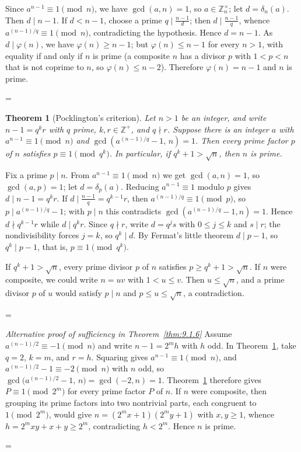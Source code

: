 \documentclass[11pt]{article}
\makeatletter
\theoremstyle{ntstyle}
\newtheorem{theorem}{Theorem}[subsection]
\let\nt@closedisplay\]
\def\nt@guardedclose{\@ifnextchar\par{\nt@closeafterpar}{\@ifnextchar\end{\postdisplaypenalty\@M\nt@closedisplay}{\nt@closedisplay}}}
\def\nt@closeafterpar\par{\@ifnextchar\par{\nt@closeafterpar}{\@ifnextchar\end{\postdisplaypenalty\@M\nt@closedisplay\par}{\nt@closedisplay\par}}}
\renewenvironment{proof}[1][\proofname]{\par
  \pushQED{\qed}\normalfont\topsep\medskipamount\edef\nt@afterproof{\@endparpenalty=\the\@endparpenalty\relax}\@beginparpenalty\@M\@endparpenalty\@M\let\]\nt@guardedclose\trivlist\item[]\textit{#1\@addpunct{.}} \ignorespaces}{\ifvmode\addpenalty\@M\fi\popQED\nt@afterproof\endtrivlist\@endpefalse}
\newenvironment{altproof}[1][\proofname]{\begin{proof}[#1]\renewcommand{\qedsymbol}{}}{\end{proof}}
\newcommand{\ZmodUnits}[1]{\mathbb{Z}_{#1}^{\times}}
\makeatother
\begin{document}
\begin{proof} Since $a^{n-1}\equiv1\pmod{n}$,
	we have $\gcd(a, n)=1$, so $a\in\ZmodUnits{n}$; let
	$d=\delta_n(a)$. Then $d\mid n-1$. If $d<n-1$, choose a
	prime $q\mid\tfrac{n-1}{d}$; then $d\mid\tfrac{n-1}{q}$, whence
	$a^{(n-1)/q}\equiv1\pmod{n}$, contradicting the hypothesis. Hence
	$d=n-1$. As $d\mid\varphi(n)$, we have $\varphi(n)\ge n-1$; but $\varphi(n)\le n-1$ for every $n>1$, with equality if and only if $n$ is prime (a composite $n$ has a divisor $p$ with $1<p<n$ that is not coprime to $n$, so $\varphi(n)\le n-2$). Therefore $\varphi(n)=n-1$ and $n$ is prime.

\end{proof}
\begin{theorem}[Pocklington's criterion]\label{thm:9.1.9} Let
	$n>1$ be an integer, and write $n-1=q^{k}r$ with $q$ prime,
	$k,r\in\mathbb{Z}^+$, and $q\nmid r$. Suppose there is an
	integer $a$ with $a^{n-1}\equiv1\pmod{n}$ and
	$\gcd\left(a^{(n-1)/q}-1,\,n\right)=1$. Then every prime factor $p$
	of $n$ satisfies $p\equiv1\pmod{q^{k}}$.
	In particular, if $q^k+1>\sqrt n$, then $n$ is prime.

\end{theorem}

\begin{proof} Fix a prime $p\mid n$. From
	$a^{n-1}\equiv1\pmod{n}$ we get $\gcd(a, n)=1$, so $\gcd(a, p)=1$; let
	$d=\delta_p(a)$. Reducing $a^{n-1}\equiv1$ modulo $p$
	gives $d\mid n-1=q^{k}r$. If $d\mid\tfrac{n-1}{q}=q^{k-1}r$, then
	$a^{(n-1)/q}\equiv1\pmod{p}$, so $p\mid a^{(n-1)/q}-1$; with $p\mid n$
	this contradicts $\gcd(a^{(n-1)/q}-1, n)=1$. Hence $d\nmid q^{k-1}r$
	while $d\mid q^{k}r$. Since $q\nmid r$, write $d=q^js$ with
	$0\le j\le k$ and $s\mid r$; the nondivisibility forces $j=k$, so
	$q^k\mid d$. By Fermat's little
	theorem $d\mid p-1$, so $q^{k}\mid p-1$, that is, $p\equiv1\pmod{q^{k}}$.

	If $q^k+1>\sqrt n$, every prime divisor $p$ of $n$ satisfies
	$p\ge q^k+1>\sqrt n$. If $n$ were composite, we could write $n=uv$
	with $1<u\le v$. Then $u\le\sqrt n$, and a prime divisor
	$p$ of $u$ would satisfy $p\mid n$ and $p\le u\le\sqrt n$,
	a contradiction.

\end{proof}
\begin{altproof}[Alternative proof of sufficiency in Theorem~\ref{thm:9.1.6}] Assume $a^{(n-1)/2}\equiv-1\pmod{n}$ and write $n-1=2^{m}h$
	with $h$ odd. In Theorem~\ref{thm:9.1.9}, take $q=2$, $k=m$, and
	$r=h$. Squaring
	gives $a^{n-1}\equiv1\pmod{n}$, and $a^{(n-1)/2}-1\equiv-2\pmod{n}$ with
	$n$ odd, so $\gcd\big(a^{(n-1)/2}-1,\,n\big)=\gcd(-2,n)=1$. Theorem~\ref{thm:9.1.9} therefore gives $P\equiv1\pmod{2^{m}}$ for every prime factor $P$
	of $n$. If $n$ were composite, then grouping its prime factors into two
	nontrivial parts, each congruent to $1\pmod{2^{m}}$, would give
	$n=(2^{m}x+1)(2^{m}y+1)$ with $x,y\ge1$, whence
	$h=2^{m}xy+x+y\ge2^{m}$, contradicting $h<2^{m}$. Hence $n$ is prime.

\end{altproof}
\end{document}
